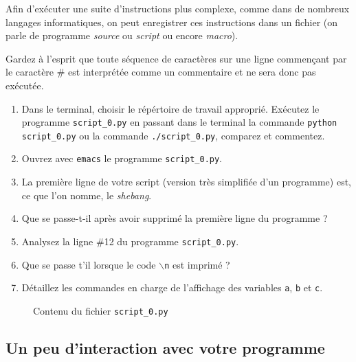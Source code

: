 Afin d'exécuter  une suite  d'instructions plus complexe,  comme dans
de nombreux langages  informatiques, on  peut enregistrer  ces
instructions  dans un fichier (on parle de programme \emph{source}
ou \emph{script} ou encore \emph{macro}).


Gardez à l'esprit  que toute séquence de caractères sur une ligne
commençant par le caractère \#  est interprétée comme un commentaire
et ne sera donc pas exécutée.

\begin{enumerate}
\item Dans le terminal, choisir le répértoire de travail approprié.
  Exécutez  le programme \texttt{script\_0.py} en  passant dans le
  terminal  la commande  \texttt{python script\_0.py}  ou la  commande
  \texttt{./script\_0.py}, comparez et commentez.

\item Ouvrez avec \texttt{emacs} le programme \texttt{script\_0.py}.

\item La première ligne de  votre script (version très simplifiée d'un
  programme) est, ce que l'on nomme, le \emph{shebang}.

\item Que  se passe-t-il après  avoir supprimé  la première  ligne du
  programme ?

\item Analysez la ligne \#12 du programme \texttt{script\_0.py}.

\item Que se passe t'il lorsque le code \texttt{$\backslash$n} est imprimé ?

\item Détaillez les commandes en  charge de l'affichage des variables
  \texttt{a}, \texttt{b} et \texttt{c}.


\end{enumerate}
\begin{figure}  
  
  \caption{Contenu du fichier \texttt{script\_0.py}}
  \label{polynome_script_0}
\end{figure}





\subsection{Un peu d'interaction avec votre programme}




